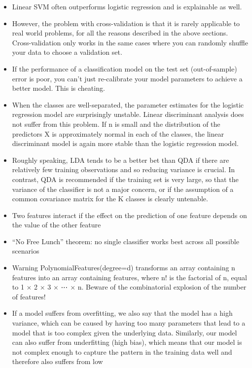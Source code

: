 \documentclass[]{book}
\theoremstyle{definition}
\theoremstyle{definition}
\theoremstyle{definition}
\theoremstyle{remark}
\begin{document}
\begin{itemize}
\item
  Linear SVM often outperforms logistic regression and is explainable as
  well.
\item
  However, the problem with cross-validation is that it is rarely
  applicable to real world problems, for all the reasons described in
  the above sections. Cross-validation only works in the same cases
  where you can randomly shuffle your data to choose a validation set.
\item
  If the performance of a classification model on the test set
  (out-of-sample) error is poor, you can't just re-calibrate your model
  parameters to achieve a better model. This is cheating.
\item
  When the classes are well-separated, the parameter estimates for the
  logistic regression model are surprisingly unstable. Linear
  discriminant analysis does not suffer from this problem. If n is small
  and the distribution of the predictors X is approximately normal in
  each of the classes, the linear discriminant model is again more
  stable than the logistic regression model.
\item
  Roughly speaking, LDA tends to be a better bet than QDA if there are
  relatively few training observations and so reducing variance is
  crucial. In contrast, QDA is recommended if the training set is very
  large, so that the variance of the classifier is not a major concern,
  or if the assumption of a common covariance matrix for the K classes
  is clearly untenable.
\item
  Two features interact if the effect on the prediction of one feature
  depends on the value of the other feature
\item
  ``No Free Lunch'' theorem: no single classifier works best across all
  possible scenarios
\item
  Warning PolynomialFeatures(degree=d) transforms an array containing n
  features into an array containing features, where n! is the factorial
  of n, equal to 1 × 2 × 3 × ⋯ × n. Beware of the combinatorial
  explosion of the number of features!
\item
  If a model suffers from overfitting, we also say that the model has a
  high variance, which can be caused by having too many parameters that
  lead to a model that is too complex given the underlying data.
  Similarly, our model can also suffer from underfitting (high bias),
  which means that our model is not complex enough to capture the
  pattern in the training data well and therefore also suffers from low

\end{itemize}
\end{document}
